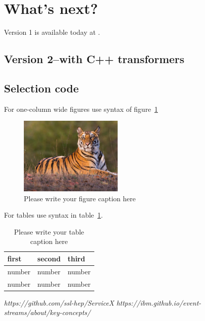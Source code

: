 \documentclass{webofc}
\begin{document}
\section{What's next?}
\label{sec:whatNext}
Version 1 is available today at \cite{RefServiceX}.

\subsection{Version 2--with C++ transformers}
\label{subsec:v2}

\subsection{Selection code}
\label{subsec:select}

For one-column wide figures use syntax of figure~\ref{fig-1}
\begin{figure}[h]
\centering
\includegraphics[width=5cm,clip]{tiger}
\caption{Please write your figure caption here}
\label{fig-1}       %
\end{figure}

For tables use syntax in table~\ref{tab-1}.
\begin{table}
\centering
\caption{Please write your table caption here}
\label{tab-1}       %
\begin{tabular}{lll}
\hline
first & second & third  \\\hline
number & number & number \\
number & number & number \\\hline
\end{tabular}
\vspace*{5cm}  %
\end{table}
%
% 
%
%
\begin{thebibliography}{}
%
%
\textit{https://github.com/ssl-hep/ServiceX}
\textit{https://ibm.github.io/event-streams/about/key-concepts/}
\end{thebibliography}
\end{document}
